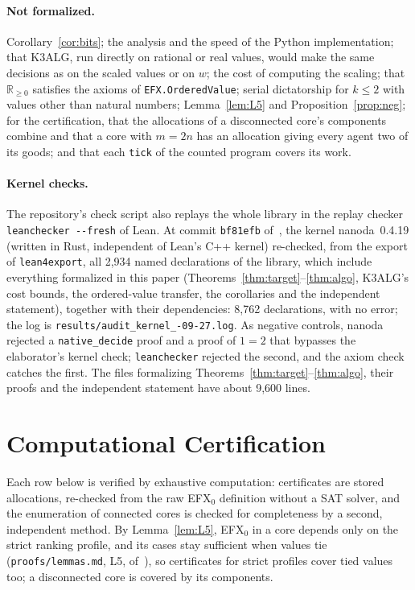 \documentclass[runningheads,11pt]{llncs}
\newcommand{\efxz}{\texorpdfstring{\mbox{EFX$_0$}}{EFX0}}
\begin{document}
\paragraph{Not formalized.} Corollary~\ref{cor:bits}; the analysis and the speed of the Python implementation; that K3ALG, run directly on rational or real values, would make the same decisions as on the scaled values or on $w$; the cost of computing the scaling; that $\mathbb{R}_{\ge0}$ satisfies the axioms of \texttt{EFX.OrderedValue}; serial dictatorship for $k\le2$ with values other than natural numbers; Lemma~\ref{lem:L5} and Proposition~\ref{prop:neg}; for the certification, that the allocations of a disconnected core's components combine and that a core with $m=2n$ has an allocation giving every agent two of its goods; and that each \texttt{tick} of the counted program covers its work.

\paragraph{Kernel checks.} The repository's check script also replays the whole library in the replay checker \texttt{leanchecker -{}-fresh} of Lean. At commit \texttt{bf81efb} of~\cite{Repo}, the kernel nanoda~0.4.19 (written in Rust, independent of Lean's C++ kernel) re-checked, from the export of \texttt{lean4export}, all 2,934 named declarations of the library, which include everything formalized in this paper (Theorems~\ref{thm:target}--\ref{thm:algo}, K3ALG's cost bounds, the ordered-value transfer, the corollaries and the independent statement), together with their dependencies: 8,762 declarations, with no error; the log is \texttt{results/\allowbreak audit\_kernel\_-09-27.log}. As negative controls, nanoda rejected a \texttt{native\_decide} proof and a proof of $1=2$ that bypasses the elaborator's kernel check; \texttt{leanchecker} rejected the second, and the axiom check catches the first. The files formalizing Theorems~\ref{thm:target}--\ref{thm:algo}, their proofs and the independent statement have about 9,600 lines.

\section{Computational Certification}\label{app:cert}

Each row below is verified by exhaustive computation: certificates are stored allocations, re-checked from the raw \efxz{} definition without a SAT solver, and the enumeration of connected cores is checked for completeness by a second, independent method. By Lemma~\ref{lem:L5}, \efxz{} in a core depends only on the strict ranking profile, and its cases stay sufficient when values tie (\texttt{proofs/lemmas.md}, L5, of~\cite{Repo}), so certificates for strict profiles cover tied values too; a disconnected core is covered by its components.
\end{document}
